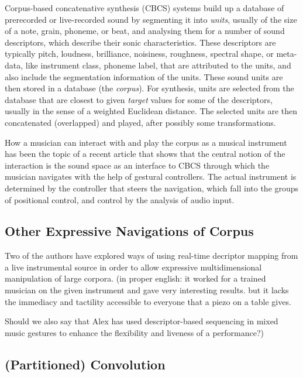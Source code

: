 Corpus-based concatenative synthesis (CBCS) \cite{Schwarz-ieeespm2007-concat} systems build up a database of prerecorded or live-recorded sound by segmenting it into
\textit{units}, usually of the size of a note, grain, phoneme, or beat, and analysing them for a
number of sound descriptors, which describe their sonic characteristics.
These descriptors are typically pitch, loudness, brilliance, noisiness, roughness, spectral shape, or meta-data, like instrument class, phoneme label, that are attributed to the units,
and also include the segmentation information of the units.
These sound units are then stored in a database (the \textit{corpus}).  For synthesis, units are
selected from the database that are closest to given \textit{target} values for some of the
descriptors, usually in the sense of a weighted Euclidean distance.
The selected units are then concatenated (overlapped) and played, after possibly some transformations.


How a musician can interact with and play the corpus as a musical instrument has been the topic of a recent article \cite{Schwarz-nime2012-sound-space} that shows that the central notion of the interaction is the sound space as an interface to CBCS through which the musician navigates with the help of gestural controllers.  
The actual instrument is determined by the controller that steers the
navigation, which fall into the groups of positional control, and control by the analysis of audio
input.

\subsection{Other Expressive Navigations of Corpus}

Two of the authors have explored ways of using real-time decriptor mapping from a live instrumental source in order to allow expressive multidimensional manipulation of large corpora. (in proper english: it worked for a trained musician on the given instrument and gave very interesting results. but it lacks the immediacy and tactility accessible to everyone that a piezo on a table gives.

Should we also say that Alex has used descriptor-based sequencing in mixed music gestures to enhance the flexibility and liveness of a performance?)

\subsection{(Partitioned) Convolution}

